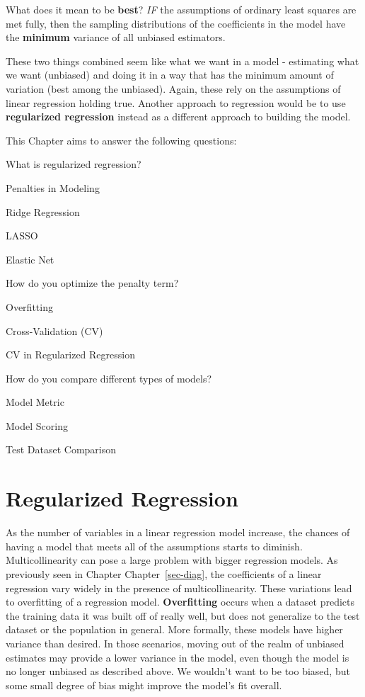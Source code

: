 \documentclass[
  letterpaper,
  DIV=11,
  numbers=noendperiod]{scrreprt}
\begin{document}
What does it mean to be \textbf{best}? \emph{IF} the assumptions of
ordinary least squares are met fully, then the sampling distributions of
the coefficients in the model have the \textbf{minimum} variance of all
unbiased estimators.

These two things combined seem like what we want in a model - estimating
what we want (unbiased) and doing it in a way that has the minimum
amount of variation (best among the unbiased). Again, these rely on the
assumptions of linear regression holding true. Another approach to
regression would be to use \textbf{regularized regression} instead as a
different approach to building the model.

This Chapter aims to answer the following questions:

What is regularized regression?

Penalties in Modeling

Ridge Regression

LASSO

Elastic Net

How do you optimize the penalty term?

Overfitting

Cross-Validation (CV)

CV in Regularized Regression

How do you compare different types of models?

Model Metric

Model Scoring

Test Dataset Comparison

\hypertarget{regularized-regression}{%
\section{Regularized Regression}\label{regularized-regression}}

As the number of variables in a linear regression model increase, the
chances of having a model that meets all of the assumptions starts to
diminish. Multicollinearity can pose a large problem with bigger
regression models. As previously seen in Chapter Chapter~\ref{sec-diag},
the coefficients of a linear regression vary widely in the presence of
multicollinearity. These variations lead to overfitting of a regression
model. \textbf{Overfitting} occurs when a dataset predicts the training
data it was built off of really well, but does not generalize to the
test dataset or the population in general. More formally, these models
have higher variance than desired. In those scenarios, moving out of the
realm of unbiased estimates may provide a lower variance in the model,
even though the model is no longer unbiased as described above. We
wouldn't want to be too biased, but some small degree of bias might
improve the model's fit overall.
\end{document}
